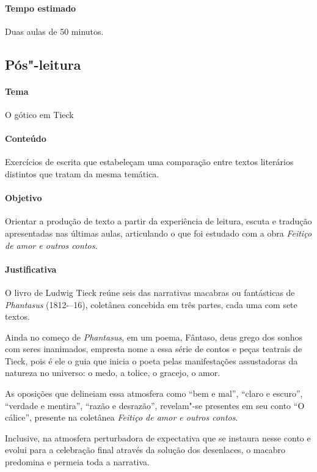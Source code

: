 \documentclass[12pt]{extarticle}
\begin{document}
\paragraph{Tempo estimado} Duas aulas de 50 minutos. 

\subsection{Pós"-leitura}

\paragraph{Tema} O gótico em Tieck

\paragraph{Conteúdo} Exercícios de escrita que estabeleçam uma comparação entre 
textos literários distintos que tratam da mesma temática.

\paragraph{Objetivo} Orientar a produção de texto a partir da experiência
de leitura, escuta e tradução apresentadas nas últimas
aulas, articulando o que foi estudado com a obra \textit{Feitiço de amor e outros contos}.

\paragraph{Justificativa} O livro de Ludwig Tieck reúne seis das narrativas macabras
ou fantásticas de \textit{Phantasus} (1812-–16), coletânea concebida em três
partes, cada uma com sete textos.

Ainda no começo de \textit{Phantasus}, em um poema, Fântaso,
deus grego dos sonhos com seres inanimados, empresta
nome a essa série de contos e peças teatrais de Tieck, pois
é ele o guia que inicia o poeta pelas manifestações assustadoras
da natureza no universo: o medo, a tolice, o gracejo,
o amor. 

As oposições que delineiam essa atmosfera como ``bem e mal'', 
``claro e escuro'', ``verdade e mentira'', ``razão e desrazão'', 
revelam"-se presentes em seu conto ``O cálice'', presente na 
coletânea \textit{Feitiço de amor e outros contos}.

Inclusive, na atmosfera perturbadora de expectativa
que se instaura nesse conto e evolui para a celebração
final através da solução dos desenlaces, o macabro predomina
e permeia toda a narrativa.
\end{document}
